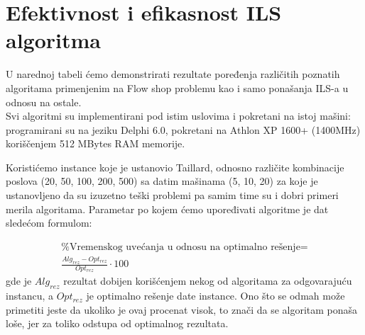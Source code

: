 \documentclass[a4paper]{article}
\begin{document}

\section{Efektivnost i efikasnost ILS algoritma}
U narednoj tabeli ćemo demonstrirati rezultate poređenja različitih poznatih algoritama primenjenim na Flow shop problemu kao i samo ponašanja ILS-a u odnosu na ostale. \\
Svi algoritmi su implementirani pod istim uslovima i pokretani na istoj mašini: programirani su na jeziku Delphi 6.0, pokretani na Athlon XP 1600+ (1400MHz) koriščenjem 512 MBytes RAM memorije. 

Koristićemo instance koje je ustanovio Taillard, odnosno različite kombinacije poslova (20, 50, 100, 200, 500) sa datim mašinama (5, 10, 20) za koje je ustanovljeno da su izuzetno teški problemi pa samim time su i dobri primeri merila algoritama. Parametar po kojem ćemo upoređivati algoritme je dat sledećom formulom:

\begin{gather*}
\textrm{\% Vremenskog uvećanja u odnosu na optimalno rešenje} = \\\frac{Alg_{rez} - Opt_{rez}}{Opt_{rez}} \cdot100
\end{gather*}
gde je $Alg_{rez}$ rezultat dobijen korišćenjem nekog od algoritama za odgovarajuću instancu, a $Opt_{rez}$ je optimalno rešenje date instance. Ono što se odmah može primetiti jeste da ukoliko je ovaj procenat visok, to znači da se algoritam ponaša loše, jer za toliko odstupa od optimalnog rezultata.
\\
\end{document}
